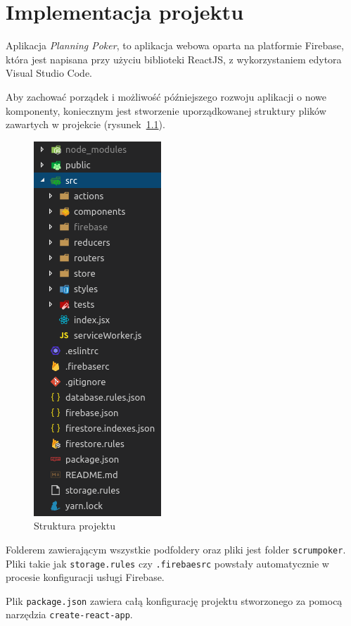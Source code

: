 ﻿%

\chapter{Implementacja projektu}

Aplikacja \textit{Planning Poker}, to aplikacja webowa oparta na platformie Firebase,
która jest napisana przy użyciu biblioteki ReactJS, z wykorzystaniem
edytora Visual Studio Code.

Aby zachować porządek i możliwość późniejszego rozwoju aplikacji o nowe komponenty,
koniecznym jest stworzenie uporządkowanej struktury plików zawartych w projekcie
(rysunek~\ref{rys:projekt}).

\begin{figure}[h]
	\centering\includegraphics[width=.3\textwidth]{img/projekt.png}
	\caption{Struktura projektu}\label{rys:projekt}%
\end{figure}

Folderem zawierającym wszystkie podfoldery oraz pliki jest folder \texttt{scrumpoker}.
Pliki takie jak \texttt{storage.rules} czy \texttt{.firebaesrc} powstały automatycznie
w procesie konfiguracji usługi Firebase.

Plik \texttt{package.json} zawiera całą konfigurację projektu stworzonego
za pomocą narzędzia \texttt{create-react-app}.

